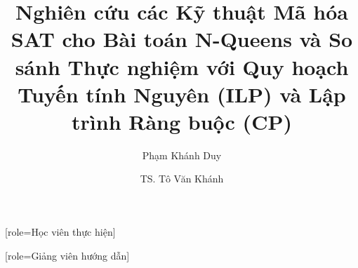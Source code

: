\documentclass[a4paper,fleqn]{cas-sc}
\begin{document}

\let\WriteBookmarks\relax
\def\floatpagepagefraction{1}
\def\textpagefraction{.001}


\title [mode = title]{Nghiên cứu các Kỹ thuật Mã hóa SAT cho Bài toán N-Queens và So sánh Thực nghiệm với Quy hoạch Tuyến tính Nguyên (ILP) và Lập trình Ràng buộc (CP)}

\author[1]{Phạm Khánh Duy}[role=Học viên thực hiện]
\cormark[1]

\author[1]{TS. Tô Văn Khánh}[role=Giảng viên hướng dẫn]

\address[1]{Khoa Công nghệ Thông tin, Trường Đại học Công nghệ, Đại học Quốc gia Hà Nội (VNU-UET), 144 Xuân Thủy, Cầu Giấy, Hà Nội, Việt Nam}

\end{document}
